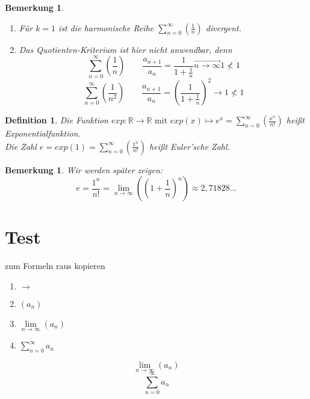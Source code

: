 \documentclass[a4paper,titlepage,oneside]{article}
\def\R{\ensuremath{\mathbb{R}} }
\def\e{\ensuremath{\mathit{e}}}
\newcommand{\suminf}[2]{\ensuremath{\sum_{#1= 0}^{\infty}{\left(#2\right)}}}
\renewcommand{\liminf}[2]{\ensuremath{\lim\limits_{#1 \rightarrow \infty}{\left(#2\right)}}}
\newcommand{\longtoinf}[1]{\overset{\longrightarrow}{#1 \to \infty}}
\theoremstyle{thmstyle}
\newtheorem{defi}[satz]{Definition}
\newtheorem{bem}[satz]{Bemerkung}
\begin{document}
\begin{bem}
\begin{enumerate}
\item Für \(k = 1\) ist die harmonische Reihe \suminf{n}{\frac{1}{n}} divergent.
\item Das Quotienten-Kriterium ist hier nicht anwendbar, denn \\
\[\suminf{n}{\frac{1}{n}} \qquad \frac{a_{n+1}}{a_n} = \frac{1}{1 + \frac{1}{n}} \longtoinf{n} 1 \not < 1\]
\[\suminf{n}{\frac{1}{n^2}} \qquad \frac{a_{n+1}}{a_n} = \left(\frac{1}{1 + \frac{1}{n}}\right)^2 \longrightarrow 1 \not < 1\]
\end{enumerate}
\end{bem}

\begin{defi}
Die Funktion \(exp: \R \to \R \text{ mit } exp(x) \mapsto \e^x = \suminf{n}{\frac{x^n}{n!}}\) heißt Exponentialfunktion.\\
Die Zahl \(\e = exp(1) = \suminf{n}{\frac{1^n}{n!}} \) heißt Euler'sche Zahl.
\end{defi}

\begin{bem}
Wir werden später zeigen:
\[\e = \frac{1^n}{n!} = \liminf{n}{\left(1 + \frac{1}{n}\right)^n} \approx 2,71828...\]
\end{bem}




 






















\newpage
\section{Test}
zum Formeln raus kopieren
\begin{enumerate}
\item \(\to\)
\item $(a_n)$
\item \(\liminf{n}{a_n}\)
\item \(\sum_{n = 0}^{\infty}{a_n}\)
\end{enumerate}
\[\liminf{n}{a_n}\]
\[\sum_{n = 0}^{\infty}{a_n}\]
\end{document}

